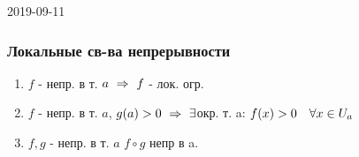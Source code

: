 \documentclass[main]{subfiles}
\begin{document}
\begin{lect}{2019-09-11}
	\subsubsection{Локальные св-ва непрерывности}
	\begin{theorem}
		\begin{enumerate}
			\item $f$ - непр. в т. $a \ \Rightarrow\  f$ - лок. огр.
			\item $f$ - непр. в т. $a$, $g(a) > 0 \ \Rightarrow\  \exists$окр. т. a: $f(x) > 0\quad \forall x \in U_a$
			\item $f, g$ - непр. в т. $a$ $f \circ g$ непр в a.
		\end{enumerate}
	\end{theorem}
\end{lect}
\end{document}
